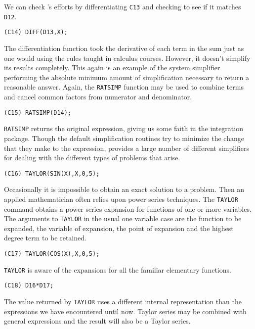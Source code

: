 We can check {\Macsyma}'s efforts by differentiating {\tt C13} and checking
to see if it matches {\tt D12}.
\begin{verbatim}
(C14) DIFF(D13,X);
\end{verbatim}
The differentiation function took the derivative of each term in the
sum just as one would using the rules taught in calculus courses.
However, it doesn't simplify its results completely.  This again is an
example of the system simplifier performing the absolute minimum
amount of simplification necessary to return a reasonable answer.
Again, the {\tt RATSIMP} function may be used to combine terms and cancel
common factors from numerator and denominator.
\begin{verbatim}
(C15) RATSIMP(D14);
\end{verbatim}

{\tt RATSIMP} returns the original expression, giving us some faith in
the integration package.  Though the default simplification routines
try to minimize the change that they make to the expression, {\Macsyma}
provides a large number of different simplifiers for dealing with the
different types of problems that arise.

\begin{verbatim}
(C16) TAYLOR(SIN(X),X,0,5);
\end{verbatim}
Occasionally it is impossible to obtain an exact solution to 
a problem.  Then an applied mathematician often relies upon
power series techniques.  
The {\tt TAYLOR} command obtains a power series expansion for functions of
one or more variables.  The arguments to {\tt TAYLOR} in the usual one variable
case are the function to be expanded, the variable of expansion, the point of
expansion and the highest degree term to be retained.
\begin{verbatim}
(C17) TAYLOR(COS(X),X,0,5);
\end{verbatim}
{\tt TAYLOR} is aware of the expansions for all the familiar elementary
functions.
\begin{verbatim}
(C18) D16*D17;
\end{verbatim}
The value returned by {\tt TAYLOR} uses a different internal representation
than the expressions we have encountered until now.  Taylor series may be
combined with general expressions and the result will also be a Taylor
series.

